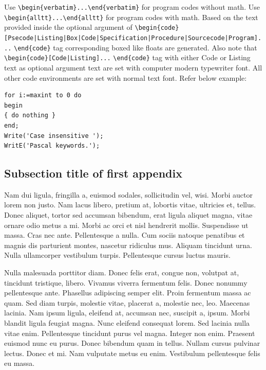 \documentclass[APA,STIX1COL]{WileyNJD-v2}
\begin{document}
Use \verb+\begin{verbatim}...\end{verbatim}+ for program codes without math. Use \verb+\begin{alltt}...\end{alltt}+ for program codes with math. Based on the text provided inside the optional argument of \verb+\begin{code}[Psecode|Listing|Box|Code|+\hfill\break \verb+Specification|Procedure|Sourcecode|Program]...+ \verb+\end{code}+ tag corresponding boxed like floats are generated. Also note that \verb+\begin{code}[Code|Listing]...+ \verb+\end{code}+ tag with either Code or Listing text as optional argument text are set with computer modern typewriter font.  All other code environments are set with normal text font. Refer below example:

\begin{lstlisting}[caption={Descriptive Caption Text},label=DescriptiveLabel]
for i:=maxint to 0 do
begin
{ do nothing }
end;
Write('Case insensitive ');
WritE('Pascal keywords.');
\end{lstlisting}



\subsection{Subsection title of first appendix\label{app1.1a}}

Nam dui ligula, fringilla a, euismod sodales, sollicitudin vel, wisi. Morbi auctor lorem non justo. Nam lacus libero,
pretium at, lobortis vitae, ultricies et, tellus. Donec aliquet, tortor sed accumsan bibendum, erat ligula aliquet magna,
vitae ornare odio metus a mi. Morbi ac orci et nisl hendrerit mollis. Suspendisse ut massa. Cras nec ante. Pellentesque
a nulla. Cum sociis natoque penatibus et magnis dis parturient montes, nascetur ridiculus mus. Aliquam tincidunt
urna. Nulla ullamcorper vestibulum turpis. Pellentesque cursus luctus mauris.

Nulla malesuada porttitor diam. Donec felis erat, congue non, volutpat at, tincidunt tristique, libero. Vivamus
viverra fermentum felis. Donec nonummy pellentesque ante. Phasellus adipiscing semper elit. Proin fermentum massa
ac quam. Sed diam turpis, molestie vitae, placerat a, molestie nec, leo. Maecenas lacinia. Nam ipsum ligula, eleifend
at, accumsan nec, suscipit a, ipsum. Morbi blandit ligula feugiat magna. Nunc eleifend consequat lorem. Sed lacinia
nulla vitae enim. Pellentesque tincidunt purus vel magna. Integer non enim. Praesent euismod nunc eu purus. Donec
bibendum quam in tellus. Nullam cursus pulvinar lectus. Donec et mi. Nam vulputate metus eu enim. Vestibulum
pellentesque felis eu massa.
\end{document}
